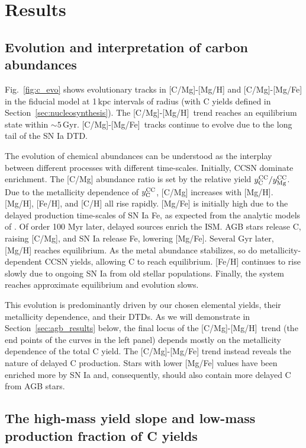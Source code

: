 \documentclass[fleqn,
usenatbib]{mnras}
\newcommand{\caah}{[C/Mg]-[Mg/H]}
\newcommand{\caafe}{[C/Mg]-[Mg/Fe]}
\newcommand{\Ycc}{{y_{\rm C}^{\rm CC}}}
\newcommand{\Ymg}{{y_{\rm Mg}^{\rm CC}}}
\newcommand{\about}[1]{${\sim} #1$}
\begin{document}
\section{Results}\label{sec:results}

\subsection{Evolution and interpretation of carbon abundances}


Fig.~\ref{fig:c_evo} shows evolutionary tracks in \caah{} and \caafe{} in the fiducial model at 1\,kpc intervals of radius (with C yields defined in Section~\ref{sec:nucleosynthesis}).
The \caah\ trend reaches an equilibrium state within \about{5}\,Gyr. \caafe\ tracks continue to evolve due to the long tail of the SN Ia DTD.

The evolution of chemical abundances can be understood as the interplay between different processes with different time-scales. 
 Initially, CCSN dominate enrichment. The [C/Mg] abundance ratio is set by the relative yield $\Ycc/\Ymg$. Due to the metallicity dependence of $\Ycc$, [C/Mg] increases with  [Mg/H]. [Mg/H], [Fe/H], and [C/H] all rise rapidly. [Mg/Fe] is initially high due to the delayed production time-scales of SN Ia Fe, as expected from the analytic models of \citet{WAF17}.
 Of order 100 Myr later, delayed sources enrich the ISM. AGB stars release C, raising [C/Mg], and SN Ia release Fe, lowering [Mg/Fe]. 
 Several Gyr later, [Mg/H] reaches equilibrium. As the metal abundance stabilizes, so do metallicity-dependent CCSN yields, allowing C to reach equilibrium. [Fe/H] continues to rise slowly due to ongoing SN Ia from old stellar populations. 
 Finally, the system reaches approximate equilibrium and evolution slows. \
 
This evolution is predominantly driven by our chosen elemental yields, their
metallicity dependence, and their DTDs.
As we will demonstrate in Section~\ref{sec:agb_results} below, the final locus of the \caah\ trend (the end points of the curves in the left panel) depends mostly on the metallicity dependence of the total C yield. The \caafe{} trend instead reveals the nature of delayed C production. Stars with lower [Mg/Fe] values have been enriched more by SN Ia and, consequently, should also contain more delayed C from AGB stars. 



\subsection{The high-mass yield slope and low-mass production fraction of C yields}\label{sec:yield_variations}
\label{sec:agb_results}
\end{document}
